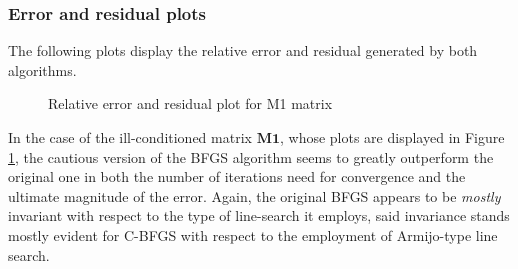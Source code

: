 \documentclass{article}
\numberwithin{equation}{section}
\begin{document}
\subsubsection{Error and residual plots}
The following plots display the relative error and residual generated by both algorithms.
\\

\begin{figure}[H]
    \centering
  \hfill
  \caption{Relative error and residual plot for M1 matrix}
    \label{fig:err_bfgs_m1}
\end{figure}

In the case of the ill-conditioned matrix $\boldsymbol{M1}$, whose plots are displayed in Figure \ref{fig:err_bfgs_m1}, the cautious version of the BFGS algorithm seems to greatly outperform the original one in both the number of iterations need for convergence and the ultimate magnitude of the error. Again, the original BFGS appears to be \textit{mostly} invariant with respect to the type of line-search it employs, said invariance stands mostly evident for C-BFGS with respect to the employment of Armijo-type line search.
\\
\end{document}
